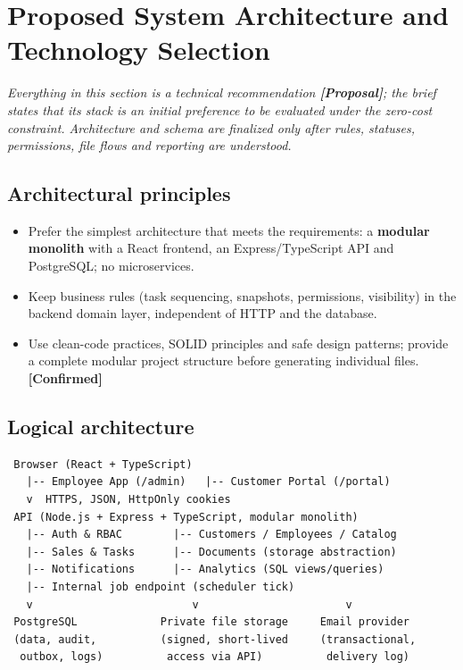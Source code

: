 \documentclass[11pt,a4paper]{article}
\newcommand{\tagconf}{\textcolor{green!45!black}{\textbf{[Confirmed]}}}
\newcommand{\tagprop}{\textcolor{orange!80!black}{\textbf{[Proposal]}}}
\begin{document}
\section{Proposed System Architecture and Technology Selection}

\emph{Everything in this section is a technical recommendation \tagprop{}; the
	brief states that its stack is an initial preference to be evaluated under the
	zero-cost constraint. Architecture and schema are finalized only after rules,
	statuses, permissions, file flows and reporting are understood.}

\subsection{Architectural principles}

\begin{itemize}
	\item Prefer the simplest architecture that meets the requirements: a
	      \textbf{modular monolith} with a React frontend, an Express/TypeScript
	      API and
	      PostgreSQL; no microservices.
	\item Keep business rules (task sequencing, snapshots, permissions,
	      visibility) in the backend domain layer, independent of HTTP and the
	      database.
	\item Use clean-code practices, SOLID principles and safe design patterns;
	      provide a complete modular project structure before generating
	      individual files.
	      \tagconf{}
\end{itemize}

\subsection{Logical architecture}

\begin{verbatim}
 Browser (React + TypeScript)
   |-- Employee App (/admin)   |-- Customer Portal (/portal)
   v  HTTPS, JSON, HttpOnly cookies
 API (Node.js + Express + TypeScript, modular monolith)
   |-- Auth & RBAC        |-- Customers / Employees / Catalog
   |-- Sales & Tasks      |-- Documents (storage abstraction)
   |-- Notifications      |-- Analytics (SQL views/queries)
   |-- Internal job endpoint (scheduler tick)
   v                         v                       v
 PostgreSQL             Private file storage     Email provider
 (data, audit,          (signed, short-lived     (transactional,
  outbox, logs)          access via API)          delivery log)
\end{verbatim}
\end{document}
